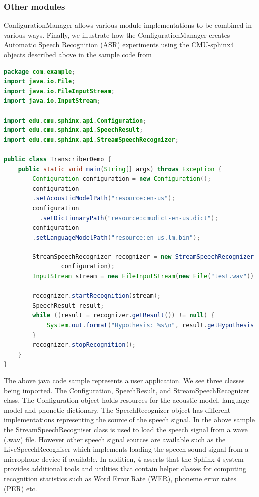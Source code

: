 \subsubsection{Other modules}
ConfigurationManager allows various module implementations to be combined in various ways.  Finally, we illustrate how the ConfigurationManager creates Automatic Speech Recognition (ASR) experiments using the CMU-sphinx4 objects described above in the sample code from \citep{Lamere03thecmu} 
\begin{lstlisting}[language=Java]
package com.example;
import java.io.File;
import java.io.FileInputStream;
import java.io.InputStream;

import edu.cmu.sphinx.api.Configuration;
import edu.cmu.sphinx.api.SpeechResult;
import edu.cmu.sphinx.api.StreamSpeechRecognizer;

public class TranscriberDemo {                                  
    public static void main(String[] args) throws Exception {      
        Configuration configuration = new Configuration();
        configuration
        .setAcousticModelPath("resource:en-us");
        configuration
		  .setDictionaryPath("resource:cmudict-en-us.dict");
        configuration
        .setLanguageModelPath("resource:en-us.lm.bin");

        StreamSpeechRecognizer recognizer = new StreamSpeechRecognizer(
                configuration);
        InputStream stream = new FileInputStream(new File("test.wav"));

        recognizer.startRecognition(stream);
        SpeechResult result;
        while ((result = recognizer.getResult()) != null) {
            System.out.format("Hypothesis: %s\n", result.getHypothesis());
        }
        recognizer.stopRecognition();
    }
}
\end{lstlisting}
The above java code sample represents a user application.  We see three classes being imported. The Configuration, SpeechResult, and StreamSpeechRecognizer class.  The Configuration object holds resources for the acoustic model, language model and phonetic dictionary.  The SpeechRecognizer object has different implementations representing the source of the speech signal.  In the above sample the StreamSpeechRecogniser class is used to load the speech signal from a wave (.wav) file.  However other speech signal sources are available such as the LiveSpeechRecogniser which implements loading the speech sound signal from a microphone device if available.  In addition, \cite{walker2004sphinx} 4 asserts that the Sphinx-4 system provides additional tools and utilities that contain helper classes for computing recognition statistics such as Word Error Rate (WER), phoneme error rates (PER) etc.

